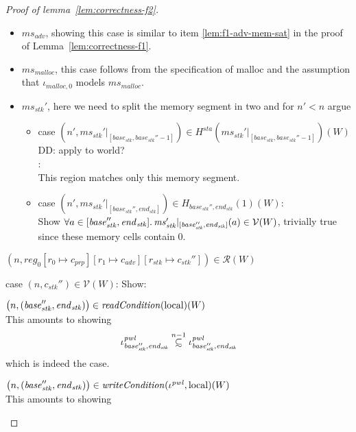 \documentclass[a4paper]{article}
\newcommand{\update}[2]{[#1 \mapsto #2]}
\newcommand\subsetsim{\mathrel{\ooalign{\raise.2ex\hbox{$\subset$}\cr
      \hidewidth\lower.8ex\hbox{\scalebox{0.9}{$\sim$}}\hidewidth\cr}}}
\newcommand{\nsubsim}[1][n]{\stackrel{\tiny{#1}}{\subsetsim}}
\newcommand\dominique[1]{{\color{purple} \sf \footnotesize {DD: #1}}\\}
\newcommand{\var}[1]{\mathit{#1}}
\newcommand{\hs}{\var{ms}}
\newcommand{\ms}{\hs}
\newcommand{\start}{\var{base}}
\newcommand{\addrend}{\var{end}}
\newcommand{\reg}{\var{reg}}
\newcommand{\adv}{\var{adv}}
\newcommand{\stk}{\var{stk}}
\newcommand{\pwl}{\var{pwl}}
\newcommand{\sta}{\var{sta}}
\newcommand{\plainfun}[2]{
  \ifthenelse{\equal{#2}{}}
  {\mathit{#1}}
  {\mathit{#1}(#2)}
}
\newcommand{\readCond}[1]{\plainfun{readCondition}{#1}}
\newcommand{\writeCond}[1]{\plainfun{writeCondition}{#1}}
\newcommand{\codelabel}[1]{\mathit{#1}}
\newcommand{\malloc}{\codelabel{malloc}}
\newcommand{\asmType}{\plaindom{AsmType}}
\newcommand{\plaindom}[1]{\mathrm{#1}}
\newcommand{\intr}[2]{\mathcal{#1}}
\newcommand{\valueintr}[1]{\intr{V}{#1}}
\newcommand{\regintr}[1]{\intr{R}{#1}}
\newcommand{\stdvr}{\valueintr{\asmType}}
\newcommand{\stdrr}{\regintr{\asmType}}
\newcommand{\npair}[2][n]{\left(#1,#2 \right)}
\newcommand{\plainperm}[1]{\mathrm{#1}}
\newcommand{\local}{\plainperm{local}}
\begin{document}
\begin{proof}[Proof of lemma~\ref{lem:correctness-f2}]
\begin{enumproof}[resume]
\begin{itemize}
                  \item $\hs_\adv$, showing this case is similar to item \ref{lem:f1-adv-mem-sat} in the proof of Lemma~\ref{lem:correctness-f1}.
                  \item $\ms_\malloc$, this case follows from the specification of malloc and the assumption that $\iota_{\malloc,0}$ models $\ms_\malloc$.    
                  \item $\ms_\stk'$, here we need to split the memory segment in two and for $n' < n$ argue
                    \begin{itemize}
                    \item case $\npair[n']{\ms_\stk'|_{[\start_\stk, \start_\stk''-1]}} \in
                      H^\sta(\ms_\stk'|_{[\start_\stk,\start_\stk''-1]})(W)$ \dominique{apply to world?}:\\ This region matches only this memory segment.
                    \item case $\npair[n']{\ms_\stk'|_{[\start_\stk'', \addrend_\stk]}} \in H_{\start_\stk'', \addrend_\stk}(1)(W)$:\\ Show $\forall a \in [\start_\stk'', \addrend_\stk] \ldotp \ms_\stk'|_{[\start_\stk'', \addrend_\stk]}(a) \in \stdvr(W)$, trivially true since these memory cells contain 0. 
                    \end{itemize}
                  \end{itemize}
                \item $\npair{\reg_0\update{r_0}{c_{\var{prp}}}\update{r_1}{c_\adv}\update{r_\stk}{c_\stk''}} \in \stdrr(W)$ \label{lem:f2-reg-rel}
                  \begin{enumproof}
                  \item case $\npair{c_\stk''} \in \stdvr(W)$: Show: \label{f2:stack-in-vr}
                    \begin{enumproof}
                    \item $\npair{(\start_\stk'', \addrend_\stk)} \in \readCond{}(\local)(W)$ \\
                      This amounts to showing 
                      \[
                        \iota^\pwl_{\start_\stk'', \addrend_\stk} \nsubsim[n-1] \iota^\pwl_{\start_\stk'', \addrend_\stk}
                      \]
                      which is indeed the case.
                    \item $\npair{(\start_\stk'', \addrend_\stk)} \in \writeCond{}(\iota^\pwl,\local)(W)$\\
                      This amounts to showing 

\end{enumproof}
\end{enumproof}
\end{enumproof}
\end{proof}
\end{document}

